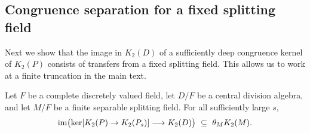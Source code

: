 \subsection{Congruence separation for a fixed splitting field}\label{app:second-tc-separation}
Next we show that the image in $K_2(D)$ of a sufficiently deep congruence kernel of $K_2(P)$ consists of transfers from a fixed splitting field.
This allows us to work at a finite truncation in the main text.

\begin{lemma}\label{lem:app-congruence-separation}
Let $F$ be a complete discretely valued field, let $D/F$ be a central division algebra, and let $M/F$ be a finite separable splitting field.
For all sufficiently large $s$,
\[
 \operatorname{im}\bigl(\ker[K_2(P)\to K_2(P_s)]\longrightarrow K_2(D)\bigr)
 \ \subseteq\ \theta_M K_2(M).
\]
\end{lemma}


